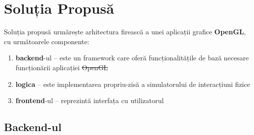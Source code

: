\documentclass[12pt,a4paper]{report}
\providecommand{\DIFaddtex}[1]{{\protect\color{blue}\uwave{#1}}} %
\providecommand{\DIFdeltex}[1]{{\protect\color{red}\sout{#1}}}                      %
\providecommand{\DIFaddbegin}{} %
\providecommand{\DIFaddend}{} %
\providecommand{\DIFdelbegin}{} %
\providecommand{\DIFdelend}{} %
\providecommand{\DIFadd}[1]{\texorpdfstring{\DIFaddtex{#1}}{#1}} %
\providecommand{\DIFdel}[1]{\texorpdfstring{\DIFdeltex{#1}}{}} %
\newcommand{\DIFscaledelfig}{0.5}
\newlength{\DIFdelgraphicswidth} %
\newlength{\DIFdelgraphicsheight} %
\newcommand{\DIFaddincludegraphics}[2][]{{\color{blue}\fbox{\DIFOincludegraphics[#1]{#2}}}} %
\newcommand{\DIFdelincludegraphics}[2][]{%
	\sbox{\DIFdelgraphicsbox}{\DIFOincludegraphics[#1]{#2}}%
	\settoboxwidth{\DIFdelgraphicswidth}{\DIFdelgraphicsbox} %
	\settoboxtotalheight{\DIFdelgraphicsheight}{\DIFdelgraphicsbox} %
	\scalebox{\DIFscaledelfig}{%
		\parbox[b]{\DIFdelgraphicswidth}{\usebox{\DIFdelgraphicsbox}\\[-\baselineskip] \rule{\DIFdelgraphicswidth}{0em}}\llap{\resizebox{\DIFdelgraphicswidth}{\DIFdelgraphicsheight}{%
				\setlength{\unitlength}{\DIFdelgraphicswidth}%
				\begin{picture}(1,1)%
				\thicklines\linethickness{2pt} %
				{\color[rgb]{1,0,0}\put(0,0){\framebox(1,1){}}}%
				{\color[rgb]{1,0,0}\put(0,0){\line( 1,1){1}}}%
				{\color[rgb]{1,0,0}\put(0,1){\line(1,-1){1}}}%
				\end{picture}%
			}\hspace*{3pt}}} %
} %
\DeclareRobustCommand{\DIFaddbegin}{\DIFOaddbegin \let\includegraphics\DIFaddincludegraphics} %
\DeclareRobustCommand{\DIFaddend}{\DIFOaddend \let\includegraphics\DIFOincludegraphics} %
\DeclareRobustCommand{\DIFdelbegin}{\DIFOdelbegin \let\includegraphics\DIFdelincludegraphics} %
\DeclareRobustCommand{\DIFdelend}{\DIFOaddend \let\includegraphics\DIFOincludegraphics} %
\begin{document}
	\chapter{Soluția Propusă}
	
	Soluția propusă urmărește arhitectura firească a unei aplicații grafice \textbf{OpenGL}, cu următoarele componente:
	\DIFdelbegin %
	
	\DIFdelend \begin{enumerate}
		\item \textbf{backend}-ul -- este un framework care oferă funcționalitățile de bază necesare funcționării aplicației \DIFdelbegin \DIFdel{OpenGL
		}\DIFdelend \DIFaddbegin \textit{\DIFadd{OpenGL}}
		\DIFaddend \item \textbf{logica} -- este implementarea propriu-zisă a simulatorului de interacțiuni fizice
		\item \textbf{frontend}-ul -- reprezintă interfața cu utilizatorul
	\end{enumerate}
	
	\section{Backend-ul}
	
\end{document}
